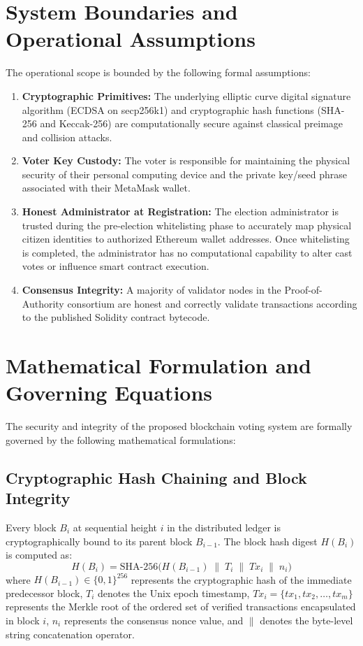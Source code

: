 \documentclass[12pt,a4paper]{report}
\begin{document}
\section{System Boundaries and Operational Assumptions}
The operational scope is bounded by the following formal assumptions:
\begin{enumerate}
    \item \textbf{Cryptographic Primitives:} The underlying elliptic curve digital signature algorithm (ECDSA on secp256k1) and cryptographic hash functions (SHA-256 and Keccak-256) are computationally secure against classical preimage and collision attacks.
    \item \textbf{Voter Key Custody:} The voter is responsible for maintaining the physical security of their personal computing device and the private key/seed phrase associated with their MetaMask wallet.
    \item \textbf{Honest Administrator at Registration:} The election administrator is trusted during the pre-election whitelisting phase to accurately map physical citizen identities to authorized Ethereum wallet addresses. Once whitelisting is completed, the administrator has no computational capability to alter cast votes or influence smart contract execution.
    \item \textbf{Consensus Integrity:} A majority of validator nodes in the Proof-of-Authority consortium are honest and correctly validate transactions according to the published Solidity contract bytecode.
\end{enumerate}

\section{Mathematical Formulation and Governing Equations}
The security and integrity of the proposed blockchain voting system are formally governed by the following mathematical formulations:

\subsection{Cryptographic Hash Chaining and Block Integrity}
Every block $B_i$ at sequential height $i$ in the distributed ledger is cryptographically bound to its parent block $B_{i-1}$. The block hash digest $H(B_i)$ is computed as:
\begin{equation}
    H(B_i) = \text{SHA-256}\Big( H(B_{i-1}) \;\parallel\; T_i \;\parallel\; Tx_i \;\parallel\; n_i \Big)
    \label{eq:block_hash}
\end{equation}
where $H(B_{i-1}) \in \{0, 1\}^{256}$ represents the cryptographic hash of the immediate predecessor block, $T_i$ denotes the Unix epoch timestamp, $Tx_i = \{tx_1, tx_2, \dots, tx_m\}$ represents the Merkle root of the ordered set of verified transactions encapsulated in block $i$, $n_i$ represents the consensus nonce value, and $\parallel$ denotes the byte-level string concatenation operator. 
\end{document}
